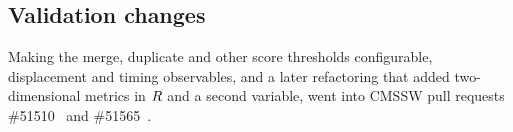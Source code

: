 \subsection{Validation changes}
Making the merge, duplicate and other score thresholds configurable, displacement and timing observables, and a later refactoring that added
two-dimensional metrics in $R$ and a second
variable, went into CMSSW pull requests
\#51510~\cite{DoljaninPR51510} and
\#51565~\cite{DoljaninPR51565}.

